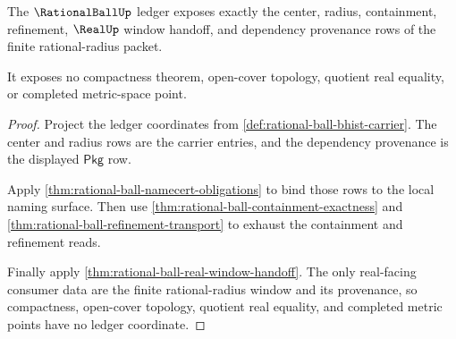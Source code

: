 \begin{theorem}
\label{thm:rationalball-ledger-exactness-obligation}
The $\RationalBallUp$ ledger exposes exactly the center, radius, containment,
refinement, $\RealUp$ window handoff, and dependency provenance rows of the
finite rational-radius packet.

It exposes no compactness theorem, open-cover topology, quotient real
equality, or completed metric-space point.
\end{theorem}
\begin{proof}
Project the ledger coordinates from
\autoref{def:rational-ball-bhist-carrier}. The center and radius rows are the
carrier entries, and the dependency provenance is the displayed
$\mathsf{Pkg}$ row.

Apply \autoref{thm:rational-ball-namecert-obligations} to bind those rows to
the local naming surface. Then use
\autoref{thm:rational-ball-containment-exactness} and
\autoref{thm:rational-ball-refinement-transport} to exhaust the containment
and refinement reads.

Finally apply \autoref{thm:rational-ball-real-window-handoff}. The only
real-facing consumer data are the finite rational-radius window and its
provenance, so compactness, open-cover topology, quotient real equality, and
completed metric points have no ledger coordinate.
\end{proof}


